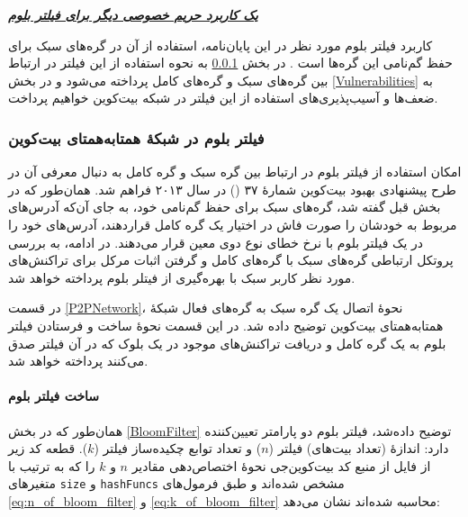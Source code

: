 \textbf{\textit{\underline{یک کاربرد حریم خصوصی دیگر برای فیلتر بلوم}}}

کاربرد فیلتر بلوم مورد نظر در این پایان‌نامه، استفاده از آن در گره‌های سبک برای حفظ گم‌نامی این گره‌ها است \cite{Hearn2013}. در بخش‌  \ref{BloomFilterInP2P} به نحوه استفاده از این فیلتر در ارتباط بین گره‌های سبک و گره‌های کامل پرداخته می‌شود و در بخش \ref{Vulnerabilities} به ضعف‌ها و آسیب‌پذیری‌های استفاده از این فیلتر در شبکه بیت‌کوین خواهیم پرداخت. 


\subsubsection{فیلتر بلوم در شبکهٔ همتا‌به‌همتای بیت‌کوین}
\label{BloomFilterInP2P}

امکان استفاده از فیلتر بلوم در ارتباط بین گره سبک و گره کامل به دنبال معرفی آن در طرح پیشنهادی بهبود بیت‌کوین شمارهٔ ۳۷ () \cite{Hearn2013} در سال ۲۰۱۳ فراهم شد. همان‌طور که در بخش قبل گفته شد، گره‌‌های سبک برای حفظ گم‌نامی خود، به جای آن‌که آدرس‌های مربوط به خودشان را صورت فاش در اختیار یک گره کامل قراردهند، آدرس‌های خود را در یک فیلتر بلوم با نرخ خطای نوع دوی معین قرار می‌دهند. در ادامه، به بررسی پروتکل ارتباطی گره‌های سبک با گره‌های کامل و گرفتن اثبات مرکل  برای تراکنش‌های مورد نظر کاربر سبک با بهره‌گیری از فیتلر بلوم پرداخته خواهد شد. 

در قسمت \ref{P2PNetwork}، نحوهٔ اتصال یک گره سبک به گره‌های فعال شبکه‌ٔ همتا‌به‌همتای بیت‌کوین توضیح داده شد. در این قسمت نحوهٔ ساخت و فرستادن فیلتر بلوم به یک گره کامل و دریافت تراکنش‌های موجود در یک بلوک که در آن فیلتر صدق می‌کنند پرداخته خواهد شد.

\paragraph{ساخت فیلتر بلوم}
همان‌طور که در بخش \ref{BloomFilter} توضیح داده‌شد، فیلتر بلوم دو پارامتر تعیین‌کننده دارد: اندازهٔ (تعداد بیت‌های) فیلتر ($n$) و تعداد توابع چکیده‌ساز فیلتر ($k$). قطعه کد زیر از فایل  از منبع کد بیت‌کوین‌جی \cite{bitcoinj_BloomFilter} نحوه‌ٔ اختصاص‌دهی مقادیر $n$ و $k$ را که به ترتیب با متغیر‌های \texttt{size} و \texttt{hashFuncs} مشخص شده‌اند و طبق فرمول‌های \eqref{eq:n_of_bloom_filter} و \eqref{eq:k_of_bloom_filter} محاسبه شده‌اند نشان می‌دهد:


